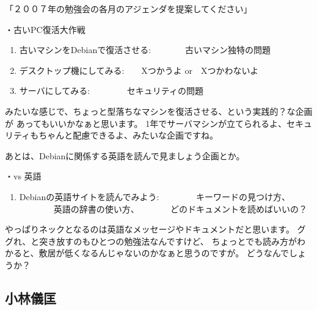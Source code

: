 \documentclass[cjk,dvipdfmx]{beamer}
\begin{document}
\begin{frame}{「２００７年の勉強会の各月のアジェンダを提案してください」}
\small

・古いPC復活大作戦
\begin{enumerate}
 \item 古いマシンをDebianで復活させる:　　　　古いマシン独特の問題
 \item デスクトップ機にしてみる:　　Xつかうよ or　Xつかわないよ
 \item サーバにしてみる:  　　　　セキュリティの問題
\end{enumerate}
みたいな感じで、ちょっと型落ちなマシンを復活させる、という実践的？な企画が
あってもいいかなぁと思います。
1年でサーバマシンが立てられるよ、セキュリティもちゃんと配慮できるよ、みたいな企画ですね。

あとは、Debianに関係する英語を読んで見ましょう企画とか。

・vs 英語
\begin{enumerate}
 \item Debianの英語サイトを読んでみよう:
 　　　　キーワードの見つけ方、
 　　　　英語の辞書の使い方、
 　　　 どのドキュメントを読めばいいの？
\end{enumerate}
やっぱりネックとなるのは英語なメッセージやドキュメントだと思います。
ググれ、と突き放すのもひとつの勉強法なんですけど、
ちょっとでも読み方がわかると、敷居が低くなるんじゃないのかなぁと思うのですが。
どうなんでしょうか？
\end{frame}


\subsection{小林儀匡}
\end{document}
